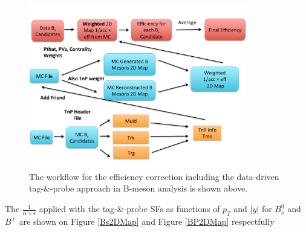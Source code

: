 \begin{figure}[h]
\begin{center}
\includegraphics[width= 0.85\textwidth]{Figures/Chapter5/EffCorrMethod.pdf}
\caption{The workflow for the efficiency correction including the data-driven tag-\&-probe approach in B-meson analysis is shown above.}
\label{EffWorkFlow}
\end{center}
\end{figure}

The $\frac{1}{\alpha \times \epsilon}$ applied with the tag-\&-probe SFs as functions of $p_T$ and $|y|$ for $B^0_s$ and $B^+$ are shown on Figure \ref{Bs2DMap} and Figure \ref{BP2DMap} respectfully 


